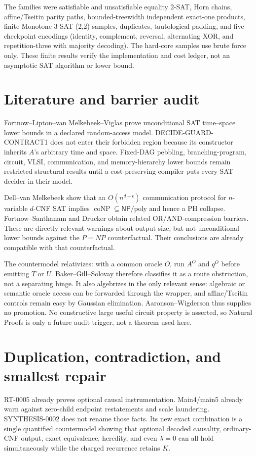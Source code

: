 \documentclass[11pt]{article}
\newcommand{\NPclass}{\mathsf{NP}}
\begin{document}
The families were satisfiable and unsatisfiable equality 2-SAT, Horn chains,
affine/Tseitin parity paths, bounded-treewidth independent exact-one products,
finite Monotone 3-SAT-(2,2) samples, duplicates, tautological padding, and
five checkpoint encodings (identity, complement, reversal, alternating XOR,
and repetition-three with majority decoding).  The hard-core samples use
brute force only.  These finite results verify the implementation and cost
ledger, not an asymptotic SAT algorithm or lower bound.

\section{Literature and barrier audit}
Fortnow--Lipton--van Melkebeek--Viglas prove unconditional SAT time--space
lower bounds in a declared random-access model.  DECIDE-GUARD-CONTRACT1 does
not enter their forbidden region because its constructor inherits $A$'s
arbitrary time and space.  Fixed-DAG pebbling, branching-program, circuit,
VLSI, communication, and memory-hierarchy lower bounds remain restricted
structural results until a cost-preserving compiler puts every SAT decider in
their model.

Dell--van Melkebeek show that an $O(n^{d-\epsilon})$ communication protocol
for $n$-variable $d$-CNF SAT implies
$\operatorname{coNP}\subseteq\NPclass/\mathrm{poly}$ and hence a PH collapse.
Fortnow--Santhanam and Drucker obtain related OR/AND-compression barriers.
These are directly relevant warnings about output size, but not unconditional
lower bounds against the $P=NP$ counterfactual.  Their conclusions are already
compatible with that counterfactual.

The countermodel relativizes: with a common oracle $O$, run $A^O$ and $q^O$
before emitting $T$ or $U$.  Baker--Gill--Solovay therefore classifies it as
a route obstruction, not a separating hinge.  It also algebrizes in the only
relevant sense: algebraic or semantic oracle access can be forwarded through
the wrapper, and affine/Tseitin controls remain easy by Gaussian elimination.
Aaronson--Wigderson thus supplies no promotion.  No constructive large useful
circuit property is asserted, so Natural Proofs is only a future audit trigger,
not a theorem used here.

\section{Duplication, contradiction, and smallest repair}
RT-0005 already proves optional causal instrumentation.  Main4/main5 already
warn against zero-child endpoint restatements and scale laundering.
SYNTHESIS-0002 does not rename those facts.  Its new exact combination is a
single quantified countermodel showing that optional decoded causality,
ordinary-CNF output, exact equivalence, heredity, and even $\lambda=0$ can all
hold simultaneously while the charged recurrence retains $K$.
\end{document}
